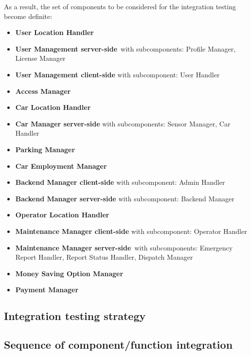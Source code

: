 	As a result, the set of components to be considered for the integration testing become definite:
	\begin{itemize}
		\item \textbf{User Location Handler}
		\item \textbf{User Management server-side} with subcomponents: Profile Manager, License Manager
		\item \textbf{User Management client-side} with subcomponent: User Handler
		\item \textbf{Access Manager}
		\item \textbf{Car Location Handler}
		\item \textbf{Car Manager server-side} with subcomponents: Sensor Manager, Car Handler
		\item \textbf{Parking Manager}
		\item \textbf{Car Employment Manager}
		\item \textbf{Backend Manager client-side} with subcomponent: Admin Handler
		\item \textbf{Backend Manager server-side} with subcomponent: Backend Manager
		\item \textbf{Operator Location Handler}
		\item \textbf{Maintenance Manager client-side} with subcomponent: Operator Handler
		\item \textbf{Maintenance Manager server-side} with subcomponents: Emergency Report Handler, Report Status Handler, Dispatch Manager
		\item \textbf{Money Saving Option Manager}
		\item \textbf{Payment Manager}
	\end{itemize}
	

\subsection{Integration testing strategy}

\subsection{Sequence of component/function integration}
